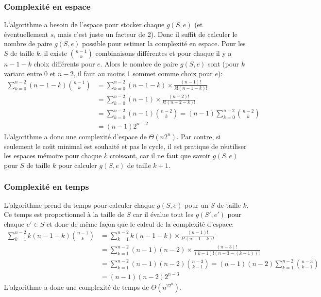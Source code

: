 \documentclass[../main.tex]{subfiles}
\begin{document}
\subsubsection{Complexité en espace}
L'algorithme a besoin de l'espace pour stocker chaque $g(S,e)$ (et éventuellement $s_i$ mais c'est juste un facteur de 2). Donc il suffit de calculer le nombre de paire $g(S, e)$ possible pour estimer la complexité en espace. Pour les $S$ de taille $k$, il existe $\binom{n-1}{k}$ combinaisons différentes et pour chaque il y a $n-1-k$ choix différents pour $e$. Alors le nombre de paire $g(S, e)$ sont (pour $k$ variant entre 0 et $n-2$, il faut au moins 1 sommet comme choix pour $e$):
\begin{align*}
\sum _{k=0}^{n-2} (n-1-k)\binom{n-1}{k} &= \sum _{k=0}^{n-2} (n-1-k)\times \frac{(n-1)!}{k!(n-1-k)!}\\
&= \sum _{k=0}^{n-2} (n-1) \times \frac{(n-2)!}{k!(n-2-k)!}\\
&= \sum _{k=0}^{n-2} (n-1) \binom{n-2}{k} = (n-1) \sum _{k=0}^{n-2} \binom{n-2}{k}\\
&= (n-1)2^{n-2}
\end{align*}
L'algorithme a donc une complexité d'espace de $\Theta (n2^n)$. Par contre, si seulement le coût minimal est souhaité et pas le cycle, il est pratique de réutiliser les espaces mémoire pour chaque $k$ croissant, car il ne faut que savoir $g(S, e)$ pour $S$ de taille $k$ pour calculer $g(S, e)$ de taille $k+1$.

\subsubsection{Complexité en temps}
L'algorithme prend du temps pour calculer chaque $g(S, e)$ pour un $S$ de taille $k$. Ce temps est proportionnel à la taille de $S$ car il évalue tout les $g(S', e')$ pour chaque $e' \in S$ et donc de même façon que le calcul de la complexité d'espace:
\begin{align*}
\sum _{k=1}^{n-2} k(n-1-k)\binom{n-1}{k} &= \sum _{k=1}^{n-2} k(n-1-k)\times \frac{(n-1)!}{k!(n-1-k)!}\\
&= \sum _{k=1}^{n-2} (n-1)(n-2) \times \frac{(n-3)!}{(k-1)!(n-3 - (k-1))!}\\
&= \sum _{k=1}^{n-2} (n-1)(n-2) \binom{n-3}{k-1} = (n-1)(n-2) \sum _{k=1}^{n-2} \binom{n-3}{k-1}\\
&= (n-1)(n-2)2^{n-3}
\end{align*}
L'algorithme a donc une complexité de temps de $\Theta (n^22^n)$.
\end{document}

